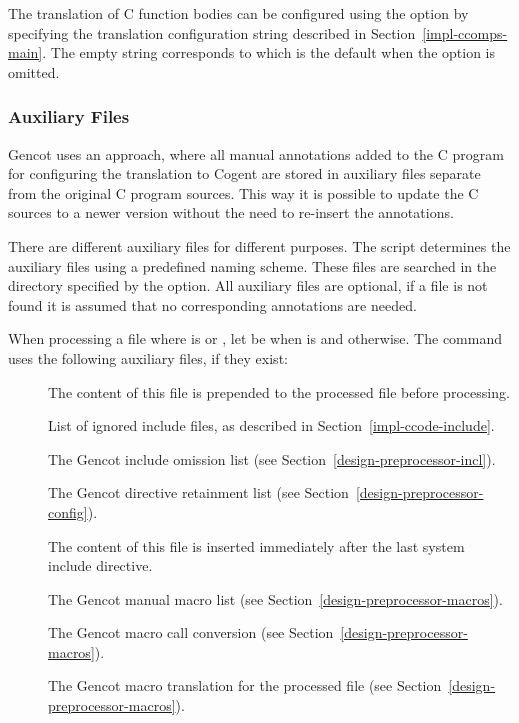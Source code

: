 The translation of C function bodies can be configured using the  option by specifying the translation configuration
string described in Section~\ref{impl-ccomps-main}. The empty string corresponds to  which is the default when
the option is omitted.

\subsubsection{Auxiliary Files}

Gencot uses an approach, where all manual annotations added to the C program for configuring the translation to Cogent 
are stored in auxiliary files separate from the original C program sources. This way it is possible to update the C 
sources to a newer version without the need to re-insert the annotations.

There are different auxiliary files for different purposes. The  script determines the auxiliary files using
a predefined naming scheme. These files are searched in the directory specified by the  option. All auxiliary files
are optional, if a file is not found it is assumed that no corresponding annotations are needed.

When processing a file  where  is  or , let  be  when 
is  and  otherwise. The  command uses the following auxiliary files, if they exist:
\begin{description}
\item[] The content of this file is prepended to the processed file before processing.
\item[] List of ignored include files, as described in Section~\ref{impl-ccode-include}.
\item[] The Gencot include omission list (see Section~\ref{design-preprocessor-incl}).
\item[] The Gencot directive retainment list (see Section~\ref{design-preprocessor-config}).
\item[] The content of this file is inserted immediately after the last system include directive.
\item[] The Gencot manual macro list (see Section~\ref{design-preprocessor-macros}).
\item[] The Gencot macro call conversion (see Section~\ref{design-preprocessor-macros}).
\item[] The Gencot macro translation for the processed file (see Section~\ref{design-preprocessor-macros}).
\end{description}

